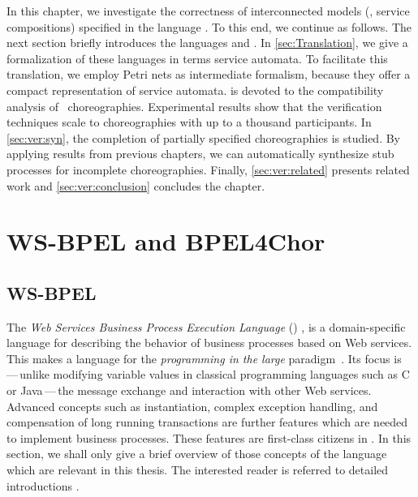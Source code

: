 \medskip

In this chapter, we investigate the correctness of interconnected models (\ie, service compositions) specified in the language \bpelchor. To this end, we continue as follows. The next section briefly introduces the languages  and \bpelchor. In \autoref{sec:Translation}, we give a formalization of these languages in terms service automata. To facilitate this translation, we employ Petri nets as intermediate formalism, because they offer a compact representation of service automata.  is devoted to the compatibility analysis of \bpelchor\ choreographies. Experimental results show that the verification techniques scale to choreographies with up to a thousand participants. In \autoref{sec:ver:syn}, the completion of partially specified choreographies is studied. By applying results from previous chapters, we can automatically synthesize stub processes for incomplete choreographies. Finally, \autoref{sec:ver:related} presents related work and \autoref{sec:ver:conclusion} concludes the chapter.





\section[WS-BPEL and BPEL4Chor]{WS-BPEL and BPEL{\footnotesize 4}Chor}




\subsection*{WS-BPEL}

The \emph{Web Services Business Process Execution Language} () \cite{standard_bpel}, is a domain-specific language for describing the behavior of business processes based on Web services. This makes  a language for the \emph{programming in the large} paradigm~\cite{DeRemerK_1976_tse}. Its focus is\,---\,unlike modifying variable values in classical programming languages such as C or Java\,---\,the message exchange and interaction with other Web services. Advanced concepts such as instantiation, complex exception handling, and compensation of long running transactions are further features which are needed to implement business processes. These features are first-class citizens in . In this section, we shall only give a brief overview of those concepts of the language which are relevant in this thesis. The interested reader is referred to detailed introductions \cite{wsbpelprimer,wsbook,AlonsoCKM_2003}.

